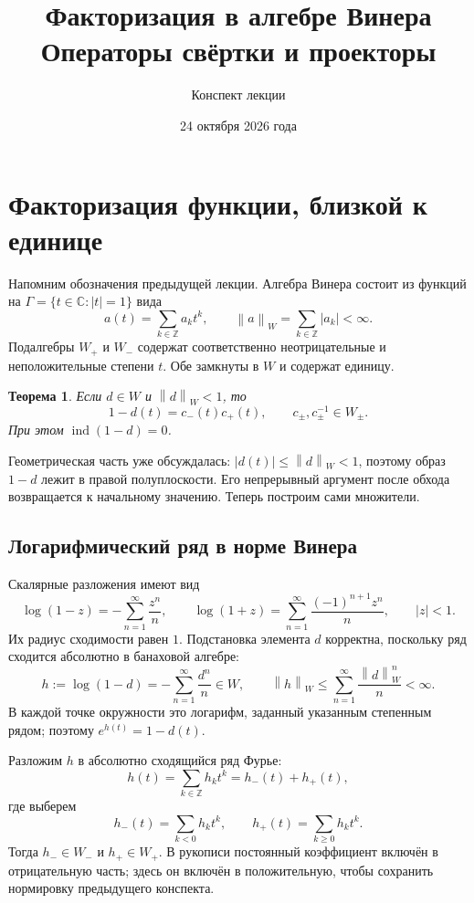 \documentclass[12pt,a4paper]{article}
\title{Факторизация в алгебре Винера\\Операторы свёртки и проекторы}
\author{Конспект лекции}
\date{24 октября 2026 года}
\newtheorem{theorem}{Теорема}
\theoremstyle{definition}
\theoremstyle{remark}
\newcommand{\CC}{\mathbb{C}}
\newcommand{\ZZ}{\mathbb{Z}}
\newcommand{\norm}[1]{\left\lVert #1\right\rVert}
\DeclareMathOperator{\ind}{ind}
\begin{document}
\maketitle

\section{Факторизация функции, близкой к единице}

Напомним обозначения предыдущей лекции. Алгебра Винера состоит
из функций на $\Gamma=\{t\in\CC:|t|=1\}$ вида
\[
  a(t)=\sum_{k\in\ZZ}a_kt^k,\qquad
  \norm{a}_W=\sum_{k\in\ZZ}|a_k|<\infty.
\]
Подалгебры $W_+$ и $W_-$ содержат соответственно неотрицательные
и неположительные степени $t$. Обе замкнуты в $W$ и содержат единицу.

\begin{theorem}
Если $d\in W$ и $\norm{d}_W<1$, то
\[
  \boxed{1-d(t)=c_-(t)c_+(t)},\qquad
  c_\pm,c_\pm^{-1}\in W_\pm.
\]
При этом $\ind(1-d)=0$.
\end{theorem}

Геометрическая часть уже обсуждалась: $|d(t)|\leqslant\norm{d}_W<1$,
поэтому образ $1-d$ лежит в правой полуплоскости. Его непрерывный
аргумент после обхода возвращается к начальному значению.
Теперь построим сами множители.

\subsection{Логарифмический ряд в норме Винера}

Скалярные разложения имеют вид
\[
  \log(1-z)=-\sum_{n=1}^{\infty}\frac{z^n}{n},\qquad
  \log(1+z)=\sum_{n=1}^{\infty}\frac{(-1)^{n+1}z^n}{n},
  \qquad |z|<1.
\]
Их радиус сходимости равен $1$. Подстановка элемента $d$ корректна,
поскольку ряд сходится абсолютно в банаховой алгебре:
\[
  h:=\log(1-d)=-\sum_{n=1}^{\infty}\frac{d^n}{n}\in W,
  \qquad
  \norm{h}_W\leqslant\sum_{n=1}^{\infty}\frac{\norm{d}_W^n}{n}<\infty.
\]
В каждой точке окружности это логарифм, заданный указанным степенным
рядом; поэтому $e^{h(t)}=1-d(t)$.

Разложим $h$ в абсолютно сходящийся ряд Фурье:
\[
  h(t)=\sum_{k\in\ZZ}h_kt^k=h_-(t)+h_+(t),
\]
где выберем
\[
  h_-(t)=\sum_{k<0}h_kt^k,\qquad
  h_+(t)=\sum_{k\geqslant0}h_kt^k.
\]
Тогда $h_-\in W_-$ и $h_+\in W_+$. В рукописи постоянный коэффициент
включён в отрицательную часть; здесь он включён в положительную,
чтобы сохранить нормировку предыдущего конспекта.
\end{document}
